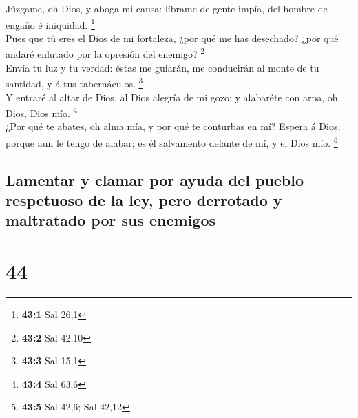  Júzgame, oh Dios, y aboga mi causa: líbrame de gente
impía, del hombre de engaño é iniquidad. \footnote{\textbf{43:1} Sal
  26,1}\\
 Pues que tú eres el Dios de mi fortaleza, ¿por qué me has
desechado? ¿por qué andaré enlutado por la opresión del enemigo?
\footnote{\textbf{43:2} Sal 42,10}\\
 Envía tu luz y tu verdad: éstas me guiarán, me conducirán
al monte de tu santidad, y á tus tabernáculos. \footnote{\textbf{43:3}
  Sal 15,1}\\
 Y entraré al altar de Dios, al Dios alegría de mi gozo; y
alabaréte con arpa, oh Dios, Dios mío. \footnote{\textbf{43:4} Sal 63,6}\\
 ¿Por qué te abates, oh alma mía, y por qué te conturbas
en mí? Espera á Dios; porque aun le tengo de alabar; es él salvamento
delante de mí, y el Dios mío. \footnote{\textbf{43:5} Sal 42,6; Sal
  42,12}

\hypertarget{lamentar-y-clamar-por-ayuda-del-pueblo-respetuoso-de-la-ley-pero-derrotado-y-maltratado-por-sus-enemigos}{%
\subsection{Lamentar y clamar por ayuda del pueblo respetuoso de la ley,
pero derrotado y maltratado por sus
enemigos}\label{lamentar-y-clamar-por-ayuda-del-pueblo-respetuoso-de-la-ley-pero-derrotado-y-maltratado-por-sus-enemigos}}

\hypertarget{section-43}{%
\section{44}\label{section-43}}

